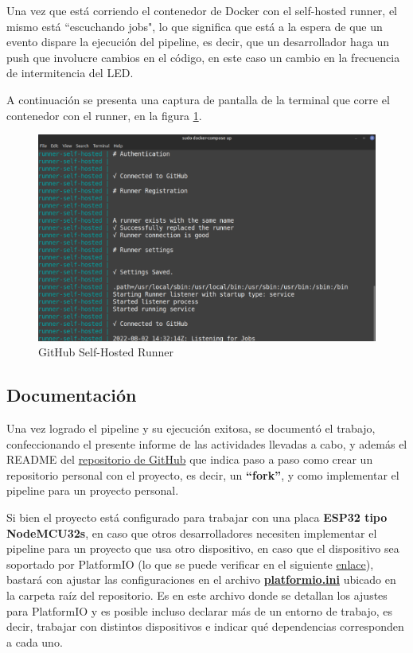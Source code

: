 Una vez que está corriendo el contenedor de Docker con el self-hosted runner, el mismo está ``escuchando jobs", lo que significa que está a la espera de que un evento dispare la ejecución del pipeline, es decir, que un desarrollador haga un push que involucre cambios en el código, en este caso un cambio en la frecuencia de intermitencia del LED.

A continuación se presenta una captura de pantalla de la terminal que corre el contenedor con el runner, en la figura \ref{fig:runner}.

\begin{figure}[H]
    \centering
    \includegraphics[width=1\textwidth]{fig/runner_log.png}
    \caption{GitHub Self-Hosted Runner}
    \label{fig:runner}
\end{figure}


\subsection{Documentación}
Una vez logrado el pipeline y su ejecución exitosa, se documentó el trabajo, confeccionando el presente informe de las actividades llevadas a cabo, y además el README del \href{https://github.com/FeedehC/pipeline-esp32}{repositorio de GitHub} que indica paso a paso como crear un repositorio personal con el proyecto, es decir, un \textbf{``fork''}, y como implementar el pipeline para un proyecto personal. 

Si bien el proyecto está configurado para trabajar con una placa \textbf{ESP32 tipo NodeMCU32s}, en caso que otros desarrolladores necesiten implementar el pipeline para un proyecto que usa otro dispositivo, en caso que el dispositivo sea soportado por PlatformIO (lo que se puede verificar en el siguiente \href{https://registry.platformio.org/search?t=platform}{enlace}), bastará con ajustar las configuraciones en el archivo \href{https://github.com/FeedehC/pipeline-esp32/blob/main/platformio.ini}{\textbf{platformio.ini}} ubicado en la carpeta raíz del repositorio. Es en este archivo donde se detallan los ajustes para PlatformIO y es posible incluso declarar más de un entorno de trabajo, es decir, trabajar con distintos dispositivos e indicar qué dependencias corresponden a cada uno. 

